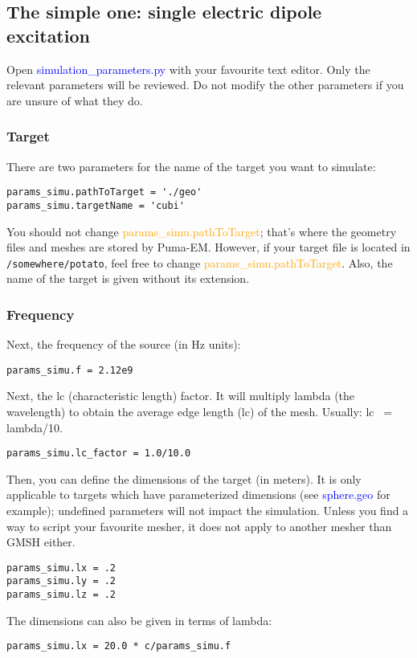 \documentclass[a4paper,10pt]{book}
\newcommand{\file}[1] {\textcolor{blue}{\textsf{#1}}}
\newcommand{\parameter}[1] {\textcolor{orange}{\textsf{#1}}}
\begin{document}
\subsection{The simple one: single electric dipole excitation}
\label{subsection:The simple one: single electric dipole excitation}
%
\par
Open \file{simulation\_parameters.py} with your favourite text editor. Only the relevant parameters will be reviewed. Do not modify the other parameters if you are unsure of what they do.

\subsubsection{Target}
%
\par
There are two parameters for the name of the target you want to simulate:
\begin{verbatim}
params_simu.pathToTarget = './geo'
params_simu.targetName = 'cubi'
\end{verbatim}
You should not change \parameter{params\_simu.pathToTarget}; that's where the geometry files and meshes are stored by Puma-EM. However, if your target file is located in \texttt{/somewhere/potato}, feel free to change \parameter{params\_simu.pathToTarget}. Also, the name of the target is given without its extension.

\subsubsection{Frequency}
%
\par
Next, the frequency of the source (in Hz units):
\begin{verbatim}
params_simu.f = 2.12e9
\end{verbatim}
%
\par
Next, the lc (characteristic length) factor. It will multiply lambda (the wavelength) to obtain the average edge length (lc) of the mesh. Usually: lc ~= lambda/10.
\begin{verbatim}
params_simu.lc_factor = 1.0/10.0
\end{verbatim}
%
\par
Then, you can define the dimensions of the target (in meters). It is only applicable to targets which have parameterized dimensions (see \file{sphere.geo} for example); undefined parameters will not impact the simulation. Unless you find a way to script your favourite mesher, it does not apply to another mesher than GMSH either.
\begin{verbatim}
params_simu.lx = .2
params_simu.ly = .2
params_simu.lz = .2
\end{verbatim}
The dimensions can also be given in terms of lambda:
\begin{verbatim}
params_simu.lx = 20.0 * c/params_simu.f
\end{verbatim}
\end{document}
